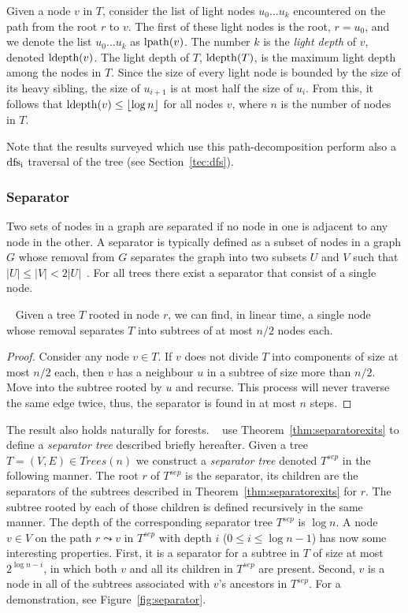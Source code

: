 Given a node $v$ in $T$, consider the list of light nodes $u_0 \dots u_k$ encountered on the path from the root $r$ to $v$. The first of these light nodes is the root, $r=u_0$, and we denote the list  $u_0 \dots u_k$ as  $\operatorname{lpath}(v)$. The number $k$ is the \emph{light depth} of $v$, denoted $\operatorname{ldepth}(v)$. The light depth of $T$, $\operatorname{ldepth}(T)$, is the maximum light depth among the nodes in $T$. Since the size of every light node is bounded by the size of its heavy sibling, the size of $u_{i+1}$ is at most half the size of $u_i$. From this, it follows that $\operatorname{ldepth}(v)\leq \left\lfloor{\log n}\right\rfloor$ for all nodes $v$, where $n$ is the number of nodes in $T$. 

Note that the results surveyed which use this path-decomposition perform also a $\operatorname{dfs_i}$ traversal of the tree (see Section~\ref{tec:dfs}).

\subsubsection{Separator}\label{tec:separator}
Two sets of nodes in a graph are separated if  no node in one is adjacent to any node in the other.
A separator is typically defined as a subset of nodes in a graph $G$ whose removal from $G$ separates the graph into two subsets $U$ and $V$
such that $\vert U \vert \leq \vert V \vert < 2 \vert U \vert$~\cite{chung1989separator}.
For all trees there exist a separator that consist of a single node.
\begin{theorem}~\cite{jordan1869assemblages}\label{thm:separatorexits}
Given a tree $T$ rooted in node $r$, we can find, in linear time,  a single node whose removal  separates  $T$ into  subtrees of at most $n/2$ nodes each.
\end{theorem}
\begin{proof}
Consider any node $v \in T$. If $v$ does not divide $T$ into components of size at most $n/2$ each, then $v$ has a neighbour $u$ in a subtree of size more than $n/2$.
 Move into the  subtree rooted by $u$  and recurse. This process will never traverse the same edge twice, thus, the separator is found in at  most $n$ steps.
\end{proof}
The result also holds naturally for forests. ~ use Theorem~\ref{thm:separatorexits}  to define a \emph{separator tree} described briefly hereafter.
Given a tree $T=(V,E) \in Trees(n)$ we construct a \emph{separator tree} denoted $T^{sep}$ in the following manner.
The root $r$  of $T^{sep}$ is the separator, its children are the separators of the subtrees  described in  Theorem~\ref{thm:separatorexits} for $r$. The subtree rooted by each of those children is defined recursively in the same manner. The depth of the corresponding separator tree $T^{sep}$ is $\log n$. 
A  node $v \in V$  on the path $r \leadsto v$ in $T^{sep}$ with depth $i$ ($0 \leq i \leq \log n -1$)  has now some interesting properties. 
First, it is a separator for a subtree in $T$  of size at most $2^{\log n- i}$, in which both $v$ and  all its children in $T^{sep}$  are present. 
Second, $v$ is a node in  all of the  subtrees associated with  $v$'s ancestors in $T^{sep}$. 
For a demonstration, see Figure~\ref{fig:separator}.

